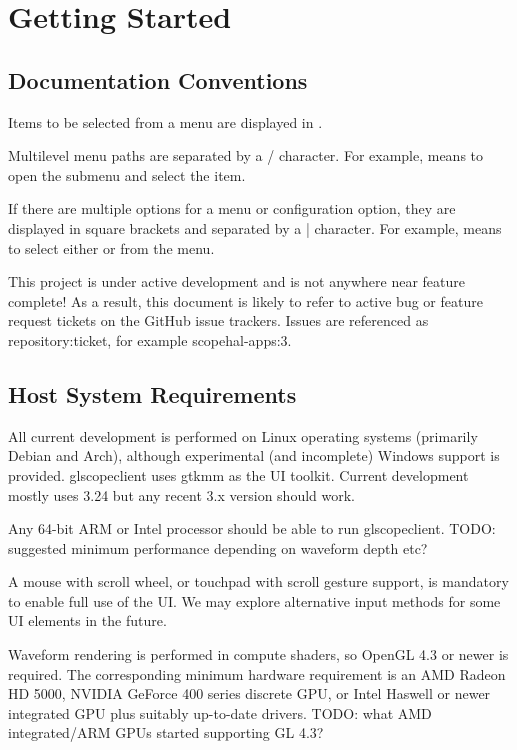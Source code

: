 \chapter{Getting Started}

\section{Documentation Conventions}

Items to be selected from a menu are displayed in .

Multilevel menu paths are separated by a / character. For example,  means to open the
 submenu and select the  item.

If there are multiple options for a menu or configuration option, they are displayed in square brackets and separated
by a | character. For example,  means to select either
 or  from the 
menu.

This project is under active development and is not anywhere near feature complete! As a result, this document is
likely to refer to active bug or feature request tickets on the GitHub issue trackers. Issues are referenced as
repository:ticket, for example scopehal-apps:3.

\section{Host System Requirements}

All current development is performed on Linux operating systems (primarily Debian and Arch), although experimental (and incomplete) Windows support is provided.
glscopeclient uses gtkmm as the UI toolkit. Current development mostly uses 3.24 but any recent 3.x version should work.

Any 64-bit ARM or Intel processor should be able to run glscopeclient. TODO: suggested minimum performance depending on
waveform depth etc?

A mouse with scroll wheel, or touchpad with scroll gesture support, is mandatory to enable full use of the UI. We may
explore alternative input methods for some UI elements in the future.

Waveform rendering is performed in compute shaders, so OpenGL 4.3 or newer is required. The corresponding minimum
hardware requirement is an AMD Radeon HD 5000, NVIDIA GeForce 400 series discrete GPU, or Intel Haswell or newer
integrated GPU plus suitably up-to-date drivers. TODO: what AMD integrated/ARM GPUs started supporting GL 4.3?

